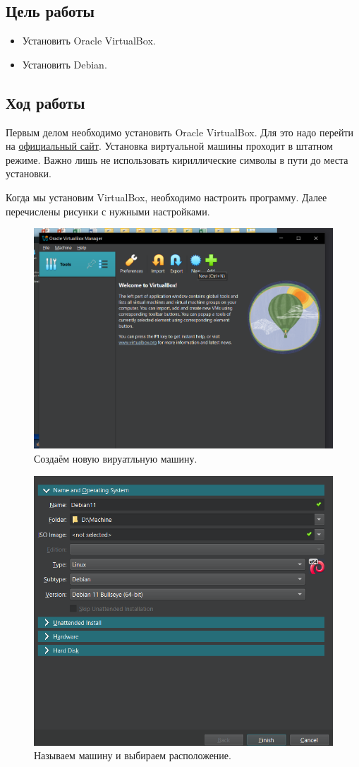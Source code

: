 \subsection{Цель работы}
\begin{itemize}
    \item Установить Oracle VirtualBox.
    \item Установить Debian.
\end{itemize}
\subsection{Ход работы}

Первым делом необходимо установить Oracle VirtualBox. Для это надо перейти на \href{https://www.virtualbox.org/}{официальный сайт}. Установка виртуальной машины проходит в штатном режиме. Важно лишь не использовать кириллические символы в пути до места установки.

Когда мы установим VirtualBox, необходимо настроить программу. Далее перечислены рисунки с нужными настройками.

\begin{figure}[h!]
    \centering
    \includegraphics[width=0.5\linewidth]{Pic/lab4/Вставленное изображение.png}
    \caption{Создаём новую вируатльную машину.}
    \label{fig:enter-label}
\end{figure}

\begin{figure}[h!]
    \centering
    \includegraphics[width=0.3\linewidth]{Pic/lab4/Вставленное изображение (2).png}
    \caption{Называем машину и выбираем расположение.}
    \label{fig:enter-label}
\end{figure}

